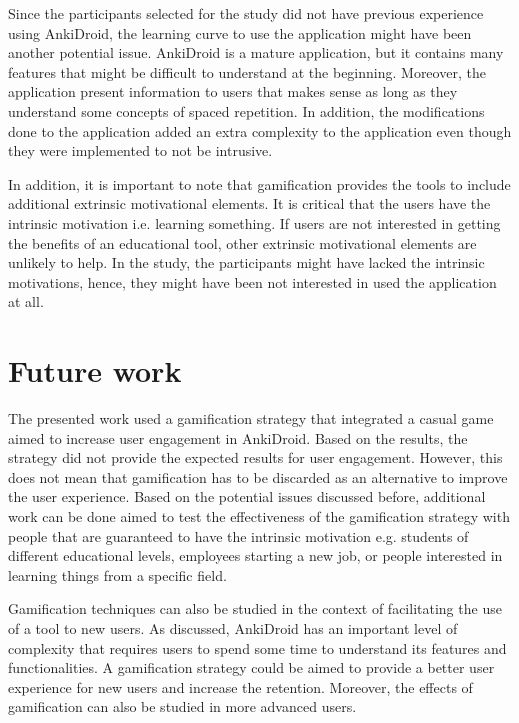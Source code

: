 Since the participants selected for the study did not have previous experience using AnkiDroid, the learning curve to use the application might have been another potential issue. AnkiDroid is a mature application, but it contains many features that might be difficult to understand at the beginning. Moreover, the application present information to users that makes sense as long as they understand some concepts of spaced repetition. In addition, the modifications done to the application added an extra complexity to the application even though they were implemented to not be intrusive.

In addition, it is important to note that gamification provides the tools to include additional extrinsic motivational elements. It is critical that the users have the intrinsic motivation i.e. learning something. If users are not interested in getting the benefits of an educational tool, other extrinsic motivational elements are unlikely to help. In the study, the participants might have lacked the intrinsic motivations, hence, they might have been not interested in used the application at all.

\section{Future work}
The presented work used a gamification strategy that integrated a casual game aimed to increase user engagement in AnkiDroid. Based on the results, the strategy did not provide the expected results for user engagement. However, this does not mean that gamification has to be discarded as an alternative to improve the user experience. Based on the potential issues discussed before, additional work can be done aimed to test the effectiveness of the gamification strategy with people that are guaranteed to have the intrinsic motivation e.g. students of different educational levels, employees starting a new job, or people interested in learning things from a specific field.

Gamification techniques can also be studied in the context of facilitating the use of a tool to new users. As discussed, AnkiDroid has an important level of complexity that requires users to spend some time to understand its features and functionalities. A gamification strategy could be aimed to provide a better user experience for new users and increase the retention. Moreover, the effects of gamification can also be studied in more advanced users.